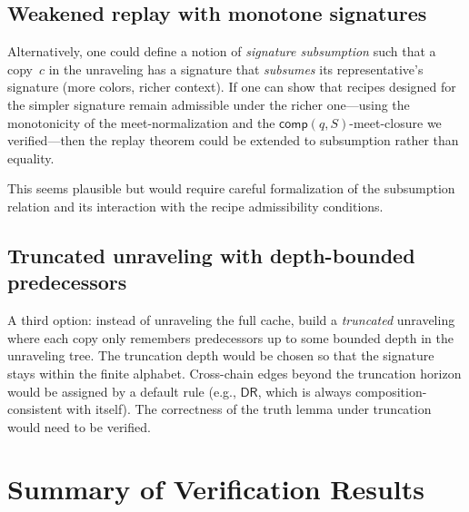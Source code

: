 \documentclass[a4paper,11pt]{article}
\theoremstyle{definition}
\newcommand{\DR}{\ensuremath{\mathsf{DR}}}
\newcommand{\comp}{\ensuremath{\mathsf{comp}}}
\begin{document}
\subsection{Weakened replay with monotone signatures}
\label{sec:repair-monotone}

Alternatively, one could define a notion of \emph{signature
subsumption} such that a copy~$c$ in the unraveling has a signature
that \emph{subsumes} its representative's signature (more colors,
richer context).  If one can show that recipes designed for the
simpler signature remain admissible under the richer one---using the
monotonicity of the meet-normalization and the
$\comp(q,S)$-meet-closure we verified---then the replay theorem could
be extended to subsumption rather than equality.

This seems plausible but would require careful formalization of the
subsumption relation and its interaction with the recipe admissibility
conditions.

\subsection{Truncated unraveling with depth-bounded predecessors}

A third option: instead of unraveling the full cache, build a
\emph{truncated} unraveling where each copy only remembers
predecessors up to some bounded depth in the unraveling tree.  The
truncation depth would be chosen so that the signature stays within
the finite alphabet.  Cross-chain edges beyond the truncation horizon
would be assigned by a default rule (e.g., $\DR$, which is always
composition-consistent with itself).  The correctness of the truth
lemma under truncation would need to be verified.


\section{Summary of Verification Results}
\label{sec:summary}
\end{document}
